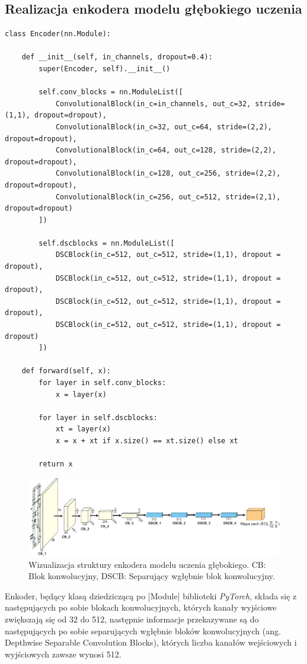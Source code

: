 \subsection{Realizacja enkodera modelu głębokiego uczenia} \label{Encoder}
\begin{lstlisting}[caption={\pyth|Encoder| - klasa enkodera modelu głębokiego uczenia.}, label={encoder}]
class Encoder(nn.Module):
	
	def __init__(self, in_channels, dropout=0.4):
		super(Encoder, self).__init__()
	
		self.conv_blocks = nn.ModuleList([
			ConvolutionalBlock(in_c=in_channels, out_c=32, stride=(1,1), dropout=dropout),
			ConvolutionalBlock(in_c=32, out_c=64, stride=(2,2), dropout=dropout),
			ConvolutionalBlock(in_c=64, out_c=128, stride=(2,2), dropout=dropout),
			ConvolutionalBlock(in_c=128, out_c=256, stride=(2,2), dropout=dropout),
			ConvolutionalBlock(in_c=256, out_c=512, stride=(2,1), dropout=dropout)
		])
		
		self.dscblocks = nn.ModuleList([
			DSCBlock(in_c=512, out_c=512, stride=(1,1), dropout = dropout),
			DSCBlock(in_c=512, out_c=512, stride=(1,1), dropout = dropout),
			DSCBlock(in_c=512, out_c=512, stride=(1,1), dropout = dropout),
			DSCBlock(in_c=512, out_c=512, stride=(1,1), dropout = dropout)
		])
	
	def forward(self, x):
		for layer in self.conv_blocks:
			x = layer(x)
	
		for layer in self.dscblocks:
			xt = layer(x)
			x = x + xt if x.size() == xt.size() else xt
	
		return x
\end{lstlisting}

\begin{figure}[h]
	\centering
	\includegraphics[width=15cm]{images/Encoder_illst.pdf}
	\caption{Wizualizacja struktury enkodera modelu uczenia głębokiego. CB: Blok konwolucyjny, DSCB: Separujący wgłębnie blok konwolucyjny.}
	\label{fig:encoder-model-vis}
\end{figure}

Enkoder, będący klasą dziedziczącą po \pyth|Module| biblioteki \textit{PyTorch}, składa się z następujących po sobie blokach konwolucyjnych, których kanały wyjściowe zwiększają się od 32 do 512, następnie informacje przekazywane są do następujących po sobie separujących wgłębnie bloków konwolucyjnych (ang. Depthwise Separable Convolution Blocks), których liczba kanałów wejściowych i wyjściowych zawsze wynosi 512.

